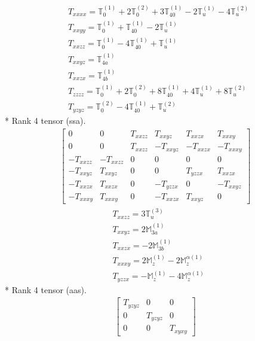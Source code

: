 \documentclass[fleqn,8pt,landscape]{jsarticle}
\begin{document}
\begin{align*}
& T_{xxxx} = \mathbb{T}_{0}^{(1)} + 2 \mathbb{T}_{0}^{(2)} + 3 \mathbb{T}_{40}^{(1)} - 2 \mathbb{T}_{u}^{(1)} - 4 \mathbb{T}_{u}^{(2)} \\
& T_{xxyy} = \mathbb{T}_{0}^{(1)} + \mathbb{T}_{40}^{(1)} - 2 \mathbb{T}_{u}^{(1)} \\
& T_{xxzz} = \mathbb{T}_{0}^{(1)} - 4 \mathbb{T}_{40}^{(1)} + \mathbb{T}_{u}^{(1)} \\
& T_{xxyz} = \mathbb{T}_{4a}^{(1)} \\
& T_{xxzx} = \mathbb{T}_{4b}^{(1)} \\
& T_{zzzz} = \mathbb{T}_{0}^{(1)} + 2 \mathbb{T}_{0}^{(2)} + 8 \mathbb{T}_{40}^{(1)} + 4 \mathbb{T}_{u}^{(1)} + 8 \mathbb{T}_{u}^{(2)} \\
& T_{yzyz} = \mathbb{T}_{0}^{(2)} - 4 \mathbb{T}_{40}^{(1)} + \mathbb{T}_{u}^{(2)}
\end{align*}
* Rank 4 tensor (ssa).
\begin{align*}
\begin{bmatrix} 0 & 0 & T_{xxzz} & T_{xxyz} & T_{xxzx} & T_{xxxy} \\ 0 & 0 & T_{xxzz} & - T_{xxyz} & - T_{xxzx} & - T_{xxxy} \\ - T_{xxzz} & - T_{xxzz} & 0 & 0 & 0 & 0 \\ - T_{xxyz} & T_{xxyz} & 0 & 0 & T_{yzzx} & T_{xxzx} \\ - T_{xxzx} & T_{xxzx} & 0 & - T_{yzzx} & 0 & - T_{xxyz} \\ - T_{xxxy} & T_{xxxy} & 0 & - T_{xxzx} & T_{xxyz} & 0 \end{bmatrix}
\end{align*}
\begin{align*}
& T_{xxzz} = 3 \mathbb{T}_{u}^{(3)} \\
& T_{xxyz} = 2 \mathbb{M}_{3a}^{(1)} \\
& T_{xxzx} = - 2 \mathbb{M}_{3b}^{(1)} \\
& T_{xxxy} = 2 \mathbb{M}_{z}^{(1)} - 2 \mathbb{M}_{z}^{\alpha(1)} \\
& T_{yzzx} = - \mathbb{M}_{z}^{(1)} - 4 \mathbb{M}_{z}^{\alpha(1)}
\end{align*}
* Rank 4 tensor (aas).
\begin{align*}
\begin{bmatrix} T_{yzyz} & 0 & 0 \\ 0 & T_{yzyz} & 0 \\ 0 & 0 & T_{xyxy} \end{bmatrix}
\end{align*}
\end{document}
